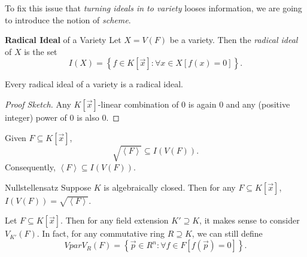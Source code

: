 \documentclass[co439]{subfiles}
\begin{document}
    \np To fix this issue that \textit{turning ideals in to variety} looses information, we are going to introduce the notion of \textit{scheme}.
    
    \begin{definition}{\textbf{Radical Ideal} of a Variety}
        Let $X = V\left( F \right)$ be a variety. Then the \emph{radical ideal} of $X$ is the set
        \begin{equation*}
            I\left( X \right) = \left\lbrace f\in K\left[ \vec{x} \right] : \forall x\in X\left[ f\left( x \right)=0 \right] \right\rbrace.
        \end{equation*}
    \end{definition}
    
    \begin{lemma}{}
        Every radical ideal of a variety is a radical ideal.
    \end{lemma}

    \begin{proof}[Proof Sketch]
        Any $K\left[ \vec{x} \right]$-linear combination of $0$ is again $0$ and any (positive integer) power of $0$ is also $0$.
    \end{proof}

    \begin{lemma}{}
        Given $F\subseteq K\left[ \vec{x} \right]$,
        \begin{equation*}
            \sqrt{\left< F \right> } \subseteq I\left( V\left( F \right) \right).
        \end{equation*}
        Consequently, $\left< F \right> \subseteq I\left( V\left( F \right) \right)$. 
    \end{lemma}

    \rruleline

    \begin{theorem}{Nullstellensatz}
        Suppose $K$ is algebraically closed. Then for any $F\subseteq K\left[ \vec{x} \right]$, $I\left( V\left( F \right) \right) = \sqrt{\left< F \right> }$.
    \end{theorem}

    \rruleline

    \np Let $F\subseteq K\left[ \vec{x} \right]$. Then for any field extension $K'\supseteq K$, it makes sense to consider $V_{K'}\left( F \right)$. In fact, for any commutative ring $R\supseteq K$, we can still define
    \begin{equation*}Vpar
        V_R\left( F \right) = \left\lbrace \vec{p}\in R^n: \forall f\in F\left[ f\left( \vec{p} \right)=0 \right] \right\rbrace.
    \end{equation*}
\end{document}
